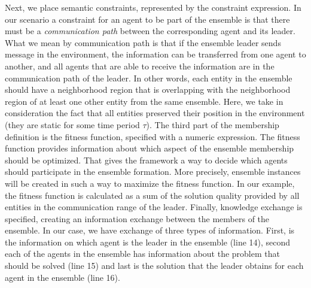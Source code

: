 \documentclass[journal]{IEEEtran}
\theoremstyle{definition}
\begin{document}

 
Next, we place semantic constraints, represented by the constraint expression. In our scenario a constraint for an agent to be part of the ensemble is that there must be a \textit{communication path} between the corresponding agent and its leader. What we mean by communication path is that if the ensemble leader sends message in the environment, the information can be transferred from one agent to another, and all agents that are able to receive the information are in the communication path of the leader.
In other words, each entity in the ensemble should have a neighborhood region that is overlapping with the neighborhood region 
of at least one other entity from the same ensemble.
Here, we take in consideration the fact that all entities preserved their position in the environment (they are static for some time period $\tau$). 
The third part of the membership definition is the fitness function, specified with a numeric expression. The fitness function provides information about which aspect of the ensemble membership should be optimized. That gives the framework a way to decide which agents should participate in the ensemble formation. More precisely, ensemble instances will be created in such a way to maximize the fitness function. In our example, the fitness function is calculated as a sum of the solution quality provided by all entities in the communication range of the leader. Finally, knowledge exchange is specified, creating an information exchange between the members of the ensemble. In our case, we have exchange of three types of information. First, is the information on which agent is the leader in the ensemble (line 14), second each of the agents in the ensemble has information about the problem that should be solved (line 15) and last is the solution that the leader obtains 
for each agent in the ensemble (line 16). 
\end{document}
